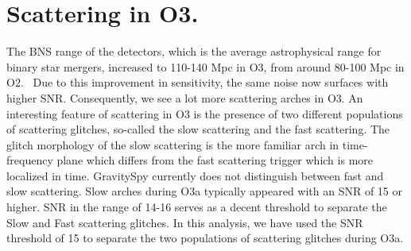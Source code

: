 \documentclass[12pt]{iopart}
\begin{document}
\section{Scattering in O3.}\label{scatino3}
The BNS range of the detectors, which is the average astrophysical range for binary star mergers, increased to 110-140 Mpc in O3, from around 80-100 Mpc in O2.~\cite{prospect} Due to this improvement in sensitivity, the same noise now surfaces with higher SNR.
Consequently, we see a lot more scattering arches in O3. An interesting feature of scattering in O3 is the presence of two different populations of scattering glitches, so-called the slow scattering and the fast scattering. The glitch morphology of the slow scattering is the more familiar arch in time-frequency plane which differs from the fast scattering trigger which is more localized in time. GravitySpy currently does not distinguish between fast and slow scattering. Slow arches during O3a  typically appeared with an SNR of 15 or higher. SNR in the range of 14-16 serves as a decent threshold to separate the Slow and Fast scattering glitches. In this analysis, we have used the SNR threshold of 15 to separate the two populations of scattering glitches during O3a.
\end{document}
